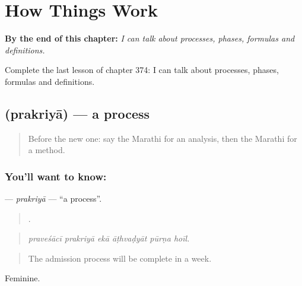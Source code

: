 
\chapter{How Things Work}
\label{ch:mr-how-things-work}

\begin{chapteropening}
\textbf{By the end of this chapter:} \emph{I can talk about processes, phases, formulas and definitions.}

Complete the last lesson of chapter 374: I can talk about processes, phases, formulas and definitions.
\end{chapteropening}

\section[\texorpdfstring{\mr{प्रक्रिया} (prakriyā)}{प्रक्रिया (prakriyā)}]{ (prakriyā) — a process}

\label{lesson:MR-C374-prakriya}



\begin{quote}
Before the new one: say the Marathi for an analysis, then the Marathi for a method.
\end{quote}

\subsection*{You'll want to know: }
\textbf{} — \emph{prakriyā} — \textquotedblleft{}a process\textquotedblright{}.

\begin{quote}
     .
\end{quote}

\begin{quote}
\emph{praveśācī prakriyā ekā āṭhvaḍyāt pūrṇa hoīl.}
\end{quote}

\begin{quote}
The admission process will be complete in a week.
\end{quote}

Feminine.

